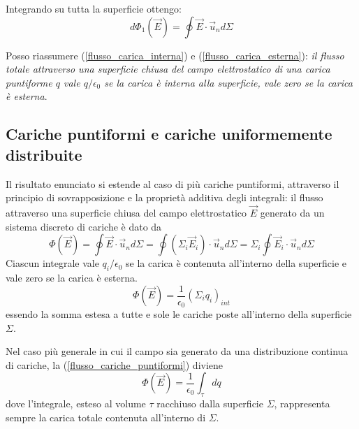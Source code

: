 \documentclass[class=book, crop=false, oneside, 12pt]{standalone}
\begin{document}
Integrando su tutta la superficie ottengo:
\begin{equation} \label{flusso_carica_esterna}
    d \Phi_1 (\overrightarrow{E}) = \oint \overrightarrow{E} \cdot \overrightarrow{u}_n d \Sigma
\end{equation}

Posso riassumere (\ref{flusso_carica_interna}) e (\ref{flusso_carica_esterna}): \emph{il flusso totale attraverso una superficie chiusa del campo elettrostatico di una carica puntiforme \(q\) vale \(q /\epsilon_0\) se la carica è interna alla superficie, vale zero se la carica è esterna}.

\subsection{Cariche puntiformi e cariche uniformemente distribuite}

Il risultato enunciato si estende al caso di più cariche puntiformi, attraverso il principio di sovrapposizione e la proprietà additiva degli integrali: 
il flusso attraverso una superficie chiusa del campo elettrostatico \(\overrightarrow{E}\) generato da un sistema discreto di cariche è dato da
\begin{equation*}
    \Phi (\overrightarrow{E}) = \oint \overrightarrow{E} \cdot \overrightarrow{u}_n d \Sigma = \oint (\Sigma_i \overrightarrow{E}_i) \cdot \overrightarrow{u}_n d \Sigma = \Sigma_i \oint \overrightarrow{E}_i \cdot \overrightarrow{u}_n d \Sigma
\end{equation*}
Ciascun integrale vale \(q_i / \epsilon_0\) se la carica è contenuta all'interno della superficie e vale zero se la carica è esterna.
\begin{equation} \label{flusso_cariche_puntiformi}
    \Phi (\overrightarrow{E}) = \frac{1}{\epsilon_0} (\Sigma_i q_i)_{int}
\end{equation}
essendo la somma estesa a tutte e sole le cariche poste all'interno della superficie \(\Sigma\).

Nel caso più generale in cui il campo sia generato da una distribuzione continua di cariche, la (\ref{flusso_cariche_puntiformi}) diviene
\begin{equation} \label{flusso_distribuzione_continua}
    \Phi (\overrightarrow{E}) = \frac{1}{\epsilon_0} \int_{\tau} dq
\end{equation}
dove l'integrale, esteso al volume \(\tau\) racchiuso dalla superficie \(\Sigma\), rappresenta sempre la carica totale contenuta all'interno di \(\Sigma\).
\end{document}
